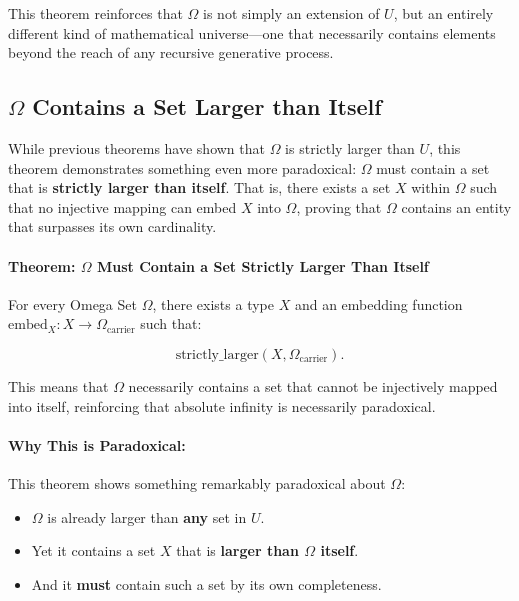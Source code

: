 \documentclass[12pt]{article}
\begin{document}
This theorem reinforces that \( \Omega \) is not simply an extension of \( U \), but an entirely different kind of mathematical universe—one that necessarily contains elements beyond the reach of any recursive generative process.


\subsection{\( \Omega \) Contains a Set Larger than Itself}

While previous theorems have shown that \( \Omega \) is strictly larger than \( U \), this theorem demonstrates something even more paradoxical: \( \Omega \) must contain a set that is \textbf{strictly larger than itself}. That is, there exists a set \( X \) within \( \Omega \) such that no injective mapping can embed \( X \) into \( \Omega \), proving that \( \Omega \) contains an entity that surpasses its own cardinality.

\paragraph{Theorem: \( \Omega \) Must Contain a Set Strictly Larger Than Itself}
For every Omega Set \( \Omega \), there exists a type \( X \) and an embedding function \( \text{embed}_X: X \to \Omega_{\text{carrier}} \) such that:

\begin{equation}
    \text{strictly\_larger}(X, \Omega_{\text{carrier}}).
\end{equation}

This means that \( \Omega \) necessarily contains a set that cannot be injectively mapped into itself, reinforcing that absolute infinity is necessarily paradoxical.

\paragraph{Why This is Paradoxical:}
This theorem shows something remarkably paradoxical about \( \Omega \):

\begin{itemize}
    \item \( \Omega \) is already larger than \textbf{any} set in \( U \).
    \item Yet it contains a set \( X \) that is \textbf{larger than \( \Omega \) itself}.
    \item And it \textbf{must} contain such a set by its own completeness.
\end{itemize}
\end{document}

